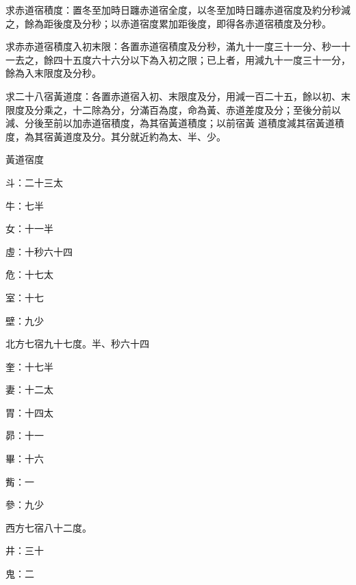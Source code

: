 \begin{pinyinscope}
 求赤道宿積度：置冬至加時日躔赤道宿全度，以冬至加時日躔赤道宿度及約分秒減之，餘為距後度及分秒；以赤道宿度累加距後度，即得各赤道宿積度及分秒。



 求赤赤道宿積度入初末限：各置赤道宿積度及分秒，滿九十一度三十一分、秒一十一去之，餘四十五度六十六分以下為入初之限；已上者，用減九十一度三十一分，餘為入末限度及分秒。



 求二十八宿黃道度：各置赤道宿入初、末限度及分，用減一百二十五，餘以初、末限度及分乘之，十二除為分，分滿百為度，命為黃、赤道差度及分；至後分前以減、分後至前以加赤道宿積度，為其宿黃道積度；以前宿黃
 道積度減其宿黃道積度，為其宿黃道度及分。其分就近約為太、半、少。



 黃道宿度



 斗：二十三太



 牛：七半



 女：十一半



 虛：十秒六十四



 危：十七太



 室：十七



 壁：九少



 北方七宿九十七度。半、秒六十四



 奎：十七半



 妻：十二太



 胃：十四太



 昴：十一



 畢：十六



 觜：一



 參：九少



 西方七宿八十二度。



 井：三十



 鬼：二




\end{pinyinscope}
